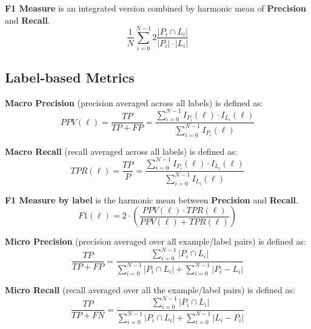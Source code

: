 \textbf{F1 Measure} is an integrated version combined by harmonic mean of \textbf{Precision} and \textbf{Recall}. 
\begin{equation}\label{eq:F1Measure}
\frac{1}{N} \sum_{i=0}^{N-1} 2 \frac{\left|P_i \cap L_i\right|}{\left|P_i\right| \cdot \left|L_i\right|}
\end{equation}

\subsection{Label-based Metrics}

\textbf{Macro Precision} (precision averaged across all labels) is defined as:
\begin{equation}\label{eq:MacroPrecision}
PPV(\ell)=\frac{TP}{TP + FP}=
          \frac{\sum_{i=0}^{N-1} I_{P_i}(\ell) \cdot I_{L_i}(\ell)}
          {\sum_{i=0}^{N-1} I_{P_i}(\ell)}
\end{equation}

\textbf{Macro Recall} (recall averaged across all labels) is defined as:
\begin{equation}\label{eq:MacroRecall}
TPR(\ell)=\frac{TP}{P}=
          \frac{\sum_{i=0}^{N-1} I_{P_i}(\ell) \cdot I_{L_i}(\ell)}
          {\sum_{i=0}^{N-1} I_{L_i}(\ell)}
\end{equation}

\textbf{F1 Measure by label} is the harmonic mean between \textbf{Precision} and \textbf{Recall}. 
\begin{equation}\label{eq:LabelAccuracy}
F1(\ell) = 2
                            \cdot \left(\frac{PPV(\ell) \cdot TPR(\ell)}
                            {PPV(\ell) + TPR(\ell)}\right)
\end{equation}

\textbf{Micro Precision} (precision averaged over all example/label pairs) is defined as:
\begin{equation}\label{eq:MicroPrecision}
\frac{TP}{TP + FP}=\frac{\sum_{i=0}^{N-1} \left|P_i \cap L_i\right|}
          {\sum_{i=0}^{N-1} \left|P_i \cap L_i\right| + \sum_{i=0}^{N-1} \left|P_i - L_i\right|}
\end{equation}

\textbf{Micro Recall} (recall averaged over all the example/label pairs) is defined as:
\begin{equation}\label{eq:MicroRecall}
\frac{TP}{TP + FN}=\frac{\sum_{i=0}^{N-1} \left|P_i \cap L_i\right|}
        {\sum_{i=0}^{N-1} \left|P_i \cap L_i\right| + \sum_{i=0}^{N-1} \left|L_i - P_i\right|}
\end{equation}

